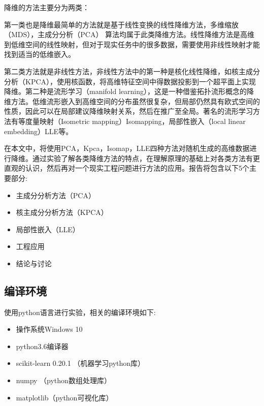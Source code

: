 \documentclass[UTF8]{ctexart}
\begin{document}
降维的方法主要分为两类：\vspace{3mm} 

第一类也是降维最简单的方法就是基于线性变换的线性降维方法，多维缩放（MDS），主成分分析（PCA） 算法均属于此类降维方法。线性降维方法是高维到低维空间的线性映射，但对于现实任务中的很多数据，需要使用非线性映射才能找到适当的低维嵌入。\vspace{3mm} 

第二类方法就是非线性方法，非线性方法中的第一种是核化线性降维，如核主成分分析（KPCA），使用核函数，将高维特征空间中得数据投影到一个超平面上实现降维。第二种是流形学习（manifold learning），这是一种借鉴拓扑流形概念的降维方法。低维流形嵌入到高维空间的分布虽然很复杂，但局部仍然具有欧式空间的性质，因此可以在局部建议降维映射关系，然后在推广至全局。著名的流形学习方法有等度量映射（Isometric mapping）Isomapping，局部性嵌入（local linear embedding）LLE等。\vspace{3mm} 


在本文中，将使用PCA，Kpca，Isomap，LLE四种方法对随机生成的高维数据进行降维。通过实验了解各类降维方法的特点，在理解原理的基础上对各类方法有更直观的认识，然后再对一个现实工程问题进行方法的应用。报告将包含以下5个主要部分:
\begin{itemize}
	\item 主成分分析方法（PCA）
	\item 核主成分分析方法（KPCA） 
	\item 局部性嵌入（LLE）
	\item 工程应用
	\item 结论与讨论
\end{itemize}
\vspace{3mm}  

\subsection{编译环境}
使用python语言进行实验，相关的编译环境如下:
	\begin{itemize}
		\item 操作系统Windows 10
		\item python3.6编译器
		\item scikit-learn 0.20.1 （机器学习python库）
		\item numpy （python数组处理库）
		\item matplotlib（python可视化库）
	\end{itemize}

\end{document}
